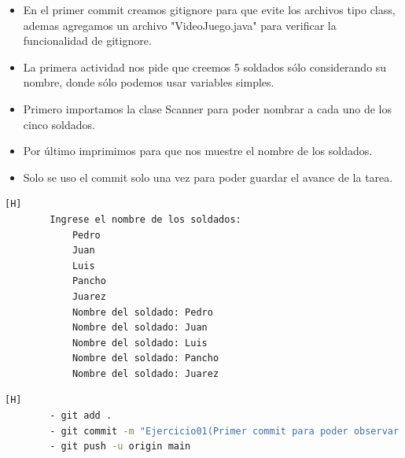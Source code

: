 \documentclass{article}
\begin{document}
	\begin{itemize}	
		\item En el primer commit creamos gitignore para que evite los archivos tipo class, ademas agregamos un archivo "VideoJuego.java" para verificar la funcionalidad de gitignore.
	\end{itemize}	
	
	
	\clearpage
	
	
	
	\begin{itemize}
		\item La primera actividad nos pide que creemos 5 soldados sólo considerando su nombre, donde sólo podemos usar variables simples.
		\item Primero importamos la clase Scanner para poder nombrar a cada uno de los cinco soldados.
		\item Por último imprimimos para que nos muestre el nombre de los soldados.
		\item Solo se uso el commit solo una vez para poder guardar el avance de la tarea.
	\end{itemize}
	\begin{lstlisting}[language=bash,caption={Ejecución del Ejercicio01}][H]
		Ingrese el nombre de los soldados: 
			Pedro
			Juan 
			Luis
			Pancho
			Juarez
			Nombre del soldado: Pedro
			Nombre del soldado: Juan
			Nombre del soldado: Luis
			Nombre del soldado: Pancho
			Nombre del soldado: Juarez
	\end{lstlisting}
	\begin{lstlisting}[language=bash,caption={Commit: Ejercicio01(Primer commit para poder observar en el git)}][H]
		- git add .
		- git commit -m "Ejercicio01(Primer commit para poder observar en el git)"			
		- git push -u origin main
	\end{lstlisting}
		\clearpage
\end{document}
